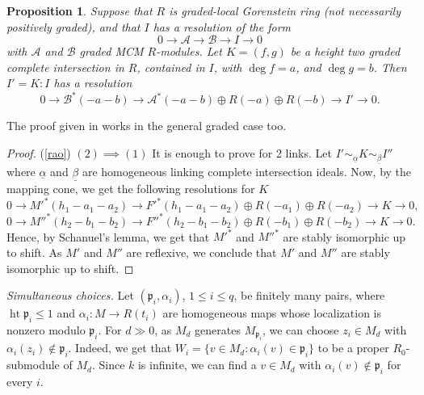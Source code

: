 \documentclass[11pt,letterpaper]{amsart}
\newcommand{\x}{\xrightarrow{}}
\theoremstyle{plain}
\newtheorem{prop}[thm]{Proposition}
\theoremstyle{definition}
\theoremstyle{remark}
\begin{document}
\begin{prop}\cite[Proposition~2.13]{CasanellasDrozdHartshorne+2005+149+171}\label{cone}
Suppose that \(R\) is  graded-local Gorenstein ring (not necessarily positively graded), and that \(I\) has a resolution of the form
\[
0 \longrightarrow \mathcal A \longrightarrow \mathcal B \longrightarrow  I \longrightarrow 0
\]
with \(\mathcal A\) and \(\mathcal B\) graded MCM $R$-modules. Let \(K=(f,g)\) be a height two graded complete intersection in \(R\), contained in \(I\), with $\deg f=a$, and $\deg g=b$. Then \(I'=K:I\) has a resolution
\[
0 \longrightarrow \mathcal B^*(-a-b)
\longrightarrow
\mathcal A^*(-a-b)\oplus R(-a)\oplus R(-b)
\longrightarrow I'
\longrightarrow 0.
\]
\end{prop}
The proof given in \cite{CasanellasDrozdHartshorne+2005+149+171} works in the general graded case too. 
\begin{proof}
    (\ref{rao}) $(2)\implies(1)$ It is enough to prove for 2 links. Let $I'\sim_{\underline{\alpha}}K\sim_{\underline{\beta}} I''$ where $\underline{\alpha}$ and $\underline{\beta}$ are homogeneous linking complete intersection ideals. Now, by the mapping cone, we get the following resolutions for $K$
    $$0\x M'^*(h_1-a_1-a_2)\x F'^*(h_1-a_1-a_2)\oplus R(-a_1)\oplus R(-a_2)\x K\x 0,$$ $$
0\x M''^*(h_2-b_1-b_2)\x F''^*(h_2-b_1-b_2)\oplus R(-b_1)\oplus R(-b_2)\x K\x 0.$$
Hence, by Schanuel's lemma, we get that $M'^*$ and $M''^*$ are stably isomorphic up to shift. As $M'$ and $M''$ are reflexive, we conclude that $M'$ and $M''$ are stably isomorphic up to shift.
\end{proof}

\noindent\emph{Simultaneous choices.}
Let \((\mathfrak p_i,\alpha_i)\), \(1\leq i\leq q\), be finitely many pairs, where \(\operatorname{ht}\mathfrak p_i\leq 1\) and \(\alpha_i:M\to R(t_i)\) are homogeneous maps whose localization is nonzero modulo \(\mathfrak p_i\). For \(d\gg 0\), as \(M_d\) generates \(M_{\mathfrak p_i}\), we can choose \(z_i\in M_d\) with \(\alpha_i(z_i)\notin\mathfrak p_i\). Indeed, we get that 
\(W_i=\{v\in M_d:\alpha_i(v)\in\mathfrak p_i\}\) to be a proper \(R_0\)-submodule of \(M_d\). Since $k$ is infinite, we can find a $v\in M_d$ with $\alpha_i(v)\notin\mathfrak p_i$ for every $i$. %
\end{document}
